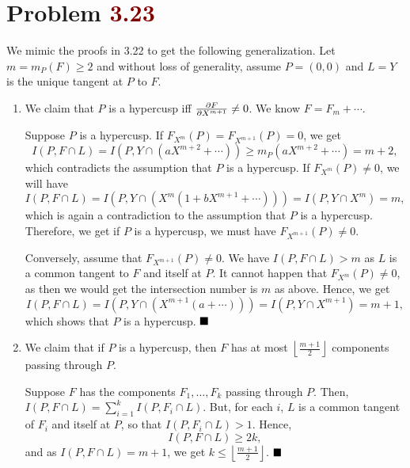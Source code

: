 \documentclass[12pt]{article}
\begin{document}
\section{Problem \textcolor{maroon}{3.23}}
We mimic the proofs in 3.22 to get the following generalization. Let \( m = m_P(F) \geq 2 \) and without loss of generality, assume \( P = (0,0) \) and \( L = Y \) is the unique tangent at \( P \) to \( F \).
\begin{enumerate}[label = (\roman*)]
    \item We claim that \( P \) is a hypercusp iff \( \pdv{F}{X^{m+1}}(P) \neq 0 \). We know \( F = F_m + \cdots \).

          Suppose \( P \) is a hypercusp. If \( F_{X^{m}}(P) = F_{X^{m+1}}(P) = 0 \), we get
          \[
              I(P, F \cap L) = I(P, Y \cap (aX^{m+2} + \cdots)) \geq m_P(aX^{m+2} + \cdots) = m+2,
          \]
          which contradicts the assumption that \( P \) is a hypercusp. If \( F_{X^{m}}(P) \neq 0 \), we will have
          \[
              I(P, F \cap L) = I(P, Y \cap (X^m(1+bX^{m+1}+\cdots))) = I(P, Y \cap X^m) = m,
          \]
          which is again a contradiction to the assumption that \( P \) is a hypercusp. Therefore, we get if \( P \) is a hypercusp, we must have \( F_{X^{m+1}}(P) \neq 0 \).

          Conversely, assume that \( F_{X^{m+1}}(P) \neq 0 \). We have \( I(P, F \cap L) > m \) as \( L \) is a common tangent to \( F \) and itself at \( P \). It cannot happen that \( F_{X^m}(P) \neq 0 \), as then we would get the intersection number is \( m \) as above. Hence, we get
          \[
              I(P, F \cap L) = I(P, Y \cap (X^{m+1}(a+\cdots))) = I(P, Y \cap X^{m+1}) = m+1,
          \]
          which shows that \( P \) is a hypercusp. \(\hfill \blacksquare\)
          \smallskip

    \item We claim that if \( P \) is a hypercusp, then \( F \) has at most \( \left\lfloor {\frac{m+1}{2}}\right\rfloor \) components passing through \( P \).

          Suppose \( F \) has the components \( F_1, \dots, F_k \) passing through \( P \). Then, \( I(P, F \cap L) = \sum_{i=1}^{k}I(P, F_i \cap L) \). But, for each \( i \), \( L \) is a common tangent of \( F_i \) and itself at \( P \), so that \( I(P, F_i \cap L) > 1 \). Hence,
          \[
              I(P, F \cap L) \geq 2k,
          \]
          and as \( I(P, F \cap L) = m+1 \), we get \( k \leq \left\lfloor {\frac{m+1}{2}}\right\rfloor \). \(\hfill \blacksquare\)
\end{enumerate}
\end{document}
